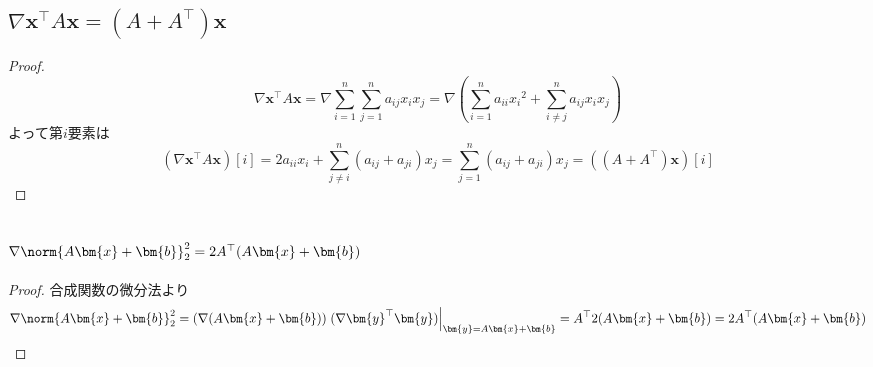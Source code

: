         \subsection{\texorpdfstring{$\nabla \bm{x}^\top A\bm{x} = (A+A^\top)\bm{x}$}{∇ x\string⊤ Ax}}
            \begin{proof}
                \quad\par
                \[\nabla \bm{x}^\top A\bm{x} = \nabla\sum_{i=1}^{n}{\sum_{j=1}^{n}{a_{ij}x_ix_j}} = \nabla\left(\sum_{i=1}^{n}{a_{ii}{x_i}^2} + \sum_{i\neq j}^{n}{a_{ij}x_ix_j}\right)\]
                よって第$i$要素は
                \[\left(\nabla \bm{x}^\top A\bm{x}\right)[i] = 2a_{ii}x_i + \sum_{j\neq i}^{n}{(a_{ij}+a_{ji})x_j} = \sum_{j=1}^{n}{(a_{ij}+a_{ji})x_j} = \left((A+A^\top)\bm{x}\right)[i]\]
            \end{proof}
        \subsection{\texorpdfstring{$\nabla\norm{A\bm{x}+\bm{b}}_2^2 = 2A^\top(A\bm{x}+\bm{b})$}{∇||Ax+b||\_2\string^2 = 2A\string^⊤(Ax+b)}}
            \begin{proof}
                \quad\par
                合成関数の微分法より
                \[ \nabla \norm{A\bm{x}+\bm{b}}_2^2 = (\nabla(A\bm{x}+\bm{b}))\left.(\nabla\bm{y}^\top\bm{y})\right|_{\bm{y}=A\bm{x}+\bm{b}} = A^\top 2(A\bm{x}+\bm{b}) = 2A^\top(A\bm{x}+\bm{b}) \]
            \end{proof}
